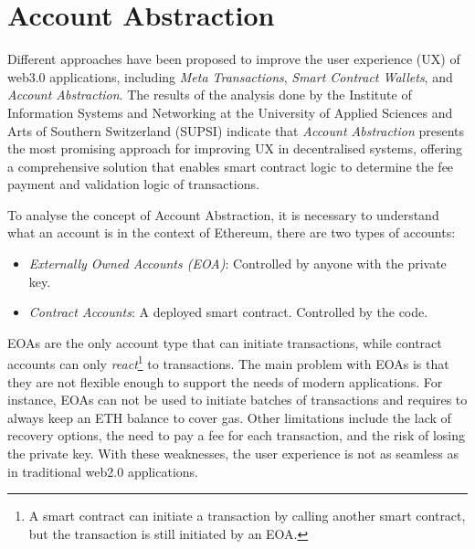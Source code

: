 \section{Account Abstraction}
\label{sec:account_abstraction}


Different approaches have been proposed to improve the user experience (UX) of web3.0 applications, including \textit{Meta Transactions}, \textit{Smart Contract Wallets}, and \textit{Account Abstraction}. The results of the analysis done by the Institute of Information Systems and Networking at the University of Applied Sciences and Arts of Southern Switzerland (SUPSI) indicate that \textit{Account Abstraction} presents the most promising approach for improving UX in decentralised systems, offering a comprehensive solution that enables smart contract logic to determine the fee payment and validation logic of transactions. \cite{isin-aa-user-experience}


To analyse the concept of Account Abstraction, it is necessary to understand what an account is in the context of Ethereum, there are two types of accounts: \cite{ethereum-accounts}
\begin{itemize}
    \item \textit{Externally Owned Accounts (EOA)}: Controlled by anyone with the private key.
    \item \textit{Contract Accounts}: A deployed smart contract. Controlled by the code.
\end{itemize}


EOAs are the only account type that can initiate transactions, while contract accounts can only \textit{react}\footnote{A smart contract can initiate a transaction by calling another smart contract, but the transaction is still initiated by an EOA.} to transactions. The main problem with EOAs is that they are not flexible enough to support the needs of modern applications. For instance, EOAs can not be used to initiate batches of transactions and requires to always keep an ETH balance to cover gas. Other limitations include the lack of recovery options, the need to pay a fee for each transaction, and the risk of losing the private key. With these weaknesses, the user experience is not as seamless as in traditional web2.0 applications. \cite{ethereum-account-abstraction}


